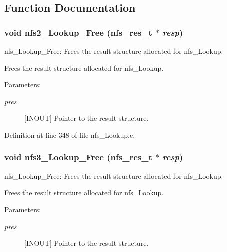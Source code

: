 \subsection{Function Documentation}
\subsubsection[{nfs2\_\-Lookup\_\-Free}]{\setlength{\rightskip}{0pt plus 5cm}void nfs2\_\-Lookup\_\-Free (nfs\_\-res\_\-t $\ast$ {\em resp})}\label{nfs__Lookup_8c_9d570d02276892797b1129e4dd639ad9}


nfs\_\-Lookup\_\-Free: Frees the result structure allocated for nfs\_\-Lookup.

Frees the result structure allocated for nfs\_\-Lookup.

\begin{Desc}
\item[Parameters:]
\begin{description}
\item[{\em pres}][INOUT] Pointer to the result structure. \end{description}
\end{Desc}


Definition at line 348 of file nfs\_\-Lookup.c.
\subsubsection[{nfs3\_\-Lookup\_\-Free}]{\setlength{\rightskip}{0pt plus 5cm}void nfs3\_\-Lookup\_\-Free (nfs\_\-res\_\-t $\ast$ {\em resp})}\label{nfs__Lookup_8c_2b42d7f9c6a317c5f84c1d962d524b13}


nfs\_\-Lookup\_\-Free: Frees the result structure allocated for nfs\_\-Lookup.

Frees the result structure allocated for nfs\_\-Lookup.

\begin{Desc}
\item[Parameters:]
\begin{description}
\item[{\em pres}][INOUT] Pointer to the result structure. \end{description}
\end{Desc}


